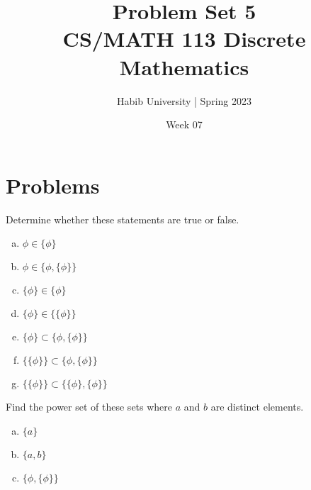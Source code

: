 \documentclass{article}
\newenvironment{problem}[2][Problem]{\begin{trivlist}
\item[\hskip \labelsep {\bfseries #1}\hskip \labelsep {\bfseries #2.}]}{\end{trivlist}}
\begin{document}
\title{Problem Set 5\\CS/MATH 113 Discrete Mathematics}
\author{Habib University | Spring 2023}
\date{Week 07}
\maketitle

\section{Problems}

\begin{problem}{1}[Chapter 2.1, Question 12]
Determine whether these statements are true or false.
\begin{enumerate}[(a)]
    \item $ \phi \in \{\phi\}$
    \item $ \phi \in \{ \phi,\{\phi\} \}$
    \item $ \{ \phi \} \in \{ \phi \} $
    \item $ \{ \phi \} \in \{\{ \phi \}\} $
    \item $ \{ \phi \} \subset \{ \phi, \{\phi \} \} $
    \item $ \{ \{ \phi \} \} \subset \{ \phi, \{ \phi \}\} $
    \item $ \{ \{ \phi \} \} \subset \{ \{\phi \}, \{ \phi \}\} $
\end{enumerate}
\end{problem}

\begin{problem}{2}[Chapter 2.1, Question 23]
Find the power set of these sets where $a$ and $b$ are distinct elements.
\begin{enumerate}[(a)]
    \item $\{a\}$
    \item $\{a,b\}$
    \item $\{ \phi, \{ \phi \}\}$
\end{enumerate}
\end{problem}
\end{document}
